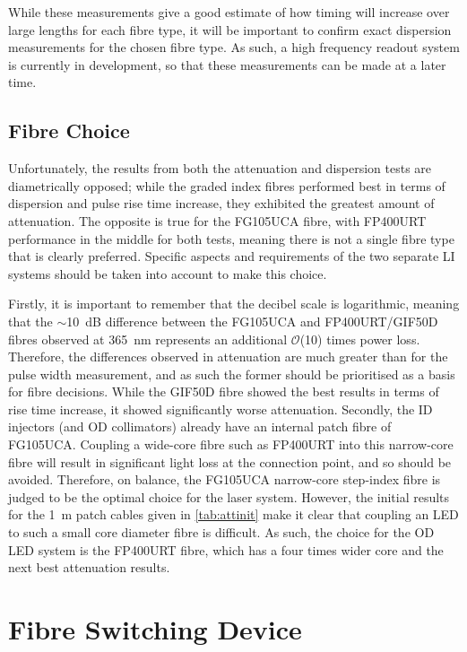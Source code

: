 \documentclass[a4paper,11pt]{article}
\let\oldsim\sim
\renewcommand{\sim}{{\oldsim}}
\begin{document}
While these measurements give a good estimate of how timing will increase over large lengths for each fibre type, it will be important to confirm exact dispersion measurements for the chosen fibre type. As such, a high frequency readout system is currently in development, so that these measurements can be made at a later time.

\subsection{Fibre Choice}\label{sec:fibre:sub:choice}

Unfortunately, the results from both the attenuation and dispersion tests are diametrically opposed; while the graded index fibres performed best in terms of dispersion and pulse rise time increase, they exhibited the greatest amount of attenuation. The opposite is true for the FG105UCA fibre, with FP400URT performance in the middle for both tests, meaning there is not a single fibre type that is clearly preferred. Specific aspects and requirements of the two separate LI systems should be taken into account to make this choice.

Firstly, it is important to remember that the decibel scale is logarithmic, meaning that the $\sim$10~dB difference between the FG105UCA and FP400URT/GIF50D fibres observed at 365~nm represents an additional $\mathcal{O}$(10) times power loss. Therefore, the differences observed in attenuation are much greater than for the pulse width measurement, and as such the former should be prioritised as a basis for fibre decisions. While the GIF50D fibre showed the best results in terms of rise time increase, it showed significantly worse attenuation. Secondly, the ID injectors (and OD collimators) already have an internal patch fibre of FG105UCA. Coupling a wide-core fibre such as FP400URT into this narrow-core fibre will result in significant light loss at the connection point, and so should be avoided. Therefore, on balance, the FG105UCA narrow-core step-index fibre is judged to be the optimal choice for the laser system. However, the initial results for the 1~m patch cables given in \cref{tab:attinit} make it clear that coupling an LED to such a small core diameter fibre is difficult. As such, the choice for the OD LED system is the FP400URT fibre, which has a four times wider core and the next best attenuation results.



\section{Fibre Switching Device}\label{sec:switch}
\end{document}
